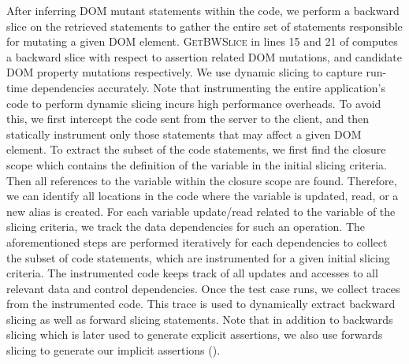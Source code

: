 After inferring DOM mutant statements within the code, we perform a backward slice on the retrieved statements to gather the entire set of \javascript statements responsible for mutating a given DOM element.
\textsc{GetBWSlice} in lines  15 and 21 of  computes a backward slice with respect to assertion related DOM mutations, and candidate DOM property mutations respectively.
We use dynamic slicing to capture run-time dependencies accurately.
Note that instrumenting the entire application's code to perform dynamic slicing incurs high performance overheads. To avoid this, we first intercept the code sent from the server to the client, and then statically instrument only those statements that may affect a given DOM element.
To extract the subset of the code statements, we first find the \javascript closure scope which contains the definition of the variable in the initial slicing criteria. Then all references to the variable within the closure scope are found. Therefore, we can identify all locations in the code where the variable is updated, read, or a new alias is created. For each variable update/read related to the variable of the slicing criteria, we track the data dependencies for such an operation. The aforementioned steps are performed iteratively for each dependencies to collect the subset of code statements, which are instrumented for a given initial slicing criteria.
The instrumented code keeps track of all updates and accesses to all relevant data and control dependencies.   
Once the test case runs, we collect traces from the instrumented code. This trace is used to dynamically extract backward slicing as well as forward slicing statements. Note that in addition to backwards slicing which is later used to generate explicit assertions, we also use forwards slicing to generate our implicit assertions ().  


